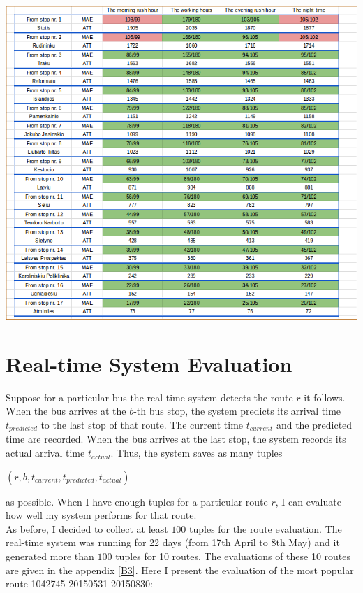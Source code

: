 \documentclass[12pt,a4paper,oneside,openright]{report}
\begin{document}
\includegraphics[width=\textwidth]{figs/table_of_vilnius.png} \\




\newpage
\section{Real-time System Evaluation}

Suppose for a particular bus the real time system detects the route $r$ it follows.
When the bus arrives at the $b$-th bus stop, the system predicts its arrival time 
$t_{predicted}$ to the last stop of that route. The current time $t_{current}$
and the predicted time are recorded. When the bus arrives at the last stop,
the system records its actual arrival time $t_{actual}$. Thus, the system saves
as many tuples

\begin{center}
$(r, b, t_{current}, t_{predicted}, t_{actual})$
\end{center}

as possible. When I have enough tuples for a particular route $r$, I can evaluate
how well my system performs for that route. \\

As before, I decided to collect at least $100$ tuples for the route evaluation. The real-time system
was running for 22 days (from 17th April to 8th May) and it generated more than $100$ tuples for
10 routes. The evaluations of these 10 routes are given in the appendix \textcolor{blue}{\ref{B3}}.
Here I present the evaluation of the most popular route 1042745-20150531-20150830:
\end{document}
